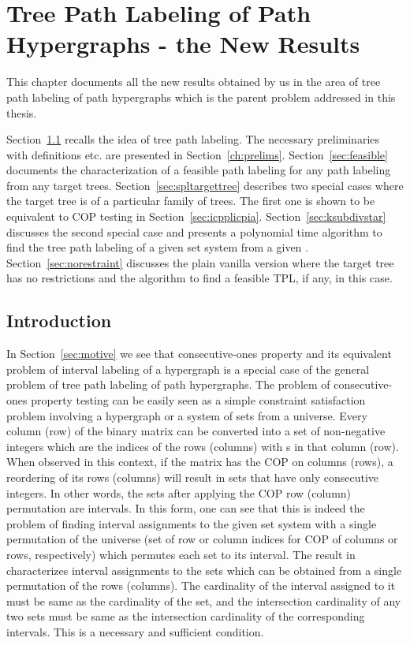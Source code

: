 \chapter{Tree Path Labeling of Path Hypergraphs - the New Results}
\label{ch:myresearch}

  This chapter documents all the new results obtained by us
in the area of tree path labeling of path hypergraphs which is the
parent problem addressed in this thesis.

Section~\ref{sec:myresearchintro} recalls the idea of tree path
labeling. The necessary preliminaries with definitions etc. are
presented in Section~\ref{ch:prelims}. Section~\ref{sec:feasible}
documents the characterization of a feasible path labeling for any
path labeling from any target trees. Section~\ref{sec:spltargettree}
describes two special cases where the target tree is of a particular
family of trees. The first one is shown to be equivalent to COP
testing in Section~\ref{sec:icpplicpia}. Section~\ref{sec:ksubdivstar}
discusses the second special case and presents a polynomial time
algorithm to find the tree path labeling of a given set system from a
given \kstar. Section~\ref{sec:norestraint} discusses the plain
vanilla version where the target tree has no restrictions and the
algorithm to find a feasible TPL, if any, in this case.


\section{Introduction}
\label{sec:myresearchintro}
In Section~\ref{sec:motive} we see that consecutive-ones property and
its equivalent problem of interval labeling of a hypergraph is a
special case of the general problem of tree path labeling of path
hypergraphs.  The problem of consecutive-ones property testing can be
easily seen as a simple constraint satisfaction problem involving a
hypergraph or a system of sets from a universe. Every column (row) of
the binary matrix can be converted into a set of non-negative integers
which are the indices of the rows (columns) with {\un}s in that column
(row). When observed in this context, if the matrix has the COP on
columns (rows), a reordering of its rows (columns) will result in sets
that have only consecutive integers. In other words, the sets after
applying the COP row (column) permutation are intervals.  In this
form, one can see that this is indeed the problem of finding interval
assignments to the given set system \cite{nsnrs09} with a single
permutation of the universe (set of row or column indices for COP of
columns or rows, respectively) which permutes each set to its
interval. The result in \cite{nsnrs09} characterizes interval
assignments to the sets which can be obtained from a single
permutation of the rows (columns). The cardinality of the interval
assigned to it must be same as the cardinality of the set, and the
intersection cardinality of any two sets must be same as the
intersection cardinality of the corresponding intervals. This is a
necessary and sufficient condition. 


